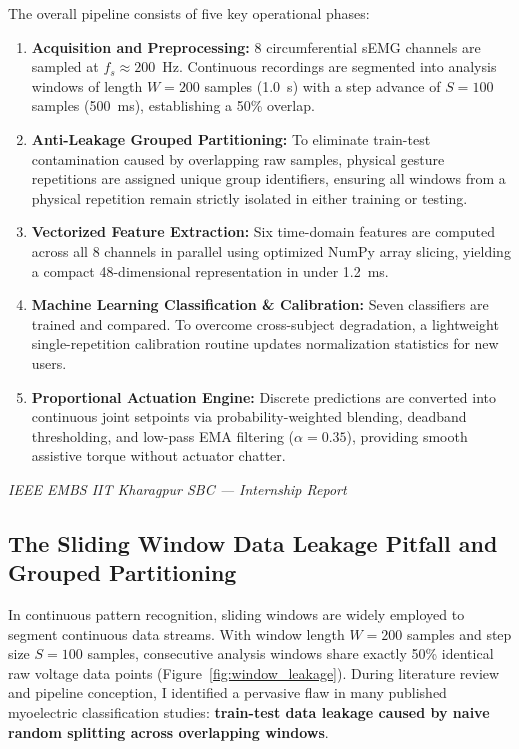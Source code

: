 \documentclass[12pt,a4paper]{article}
\begin{document}
The overall pipeline consists of five key operational phases:
\begin{enumerate}[leftmargin=*]
    \item \textbf{Acquisition and Preprocessing:} 8 circumferential sEMG channels are sampled at $f_s \approx 200$~Hz. Continuous recordings are segmented into analysis windows of length $W = 200$ samples (1.0~s) with a step advance of $S = 100$ samples (500~ms), establishing a 50\% overlap.
    \item \textbf{Anti-Leakage Grouped Partitioning:} To eliminate train-test contamination caused by overlapping raw samples, physical gesture repetitions are assigned unique group identifiers, ensuring all windows from a physical repetition remain strictly isolated in either training or testing.
    \item \textbf{Vectorized Feature Extraction:} Six time-domain features are computed across all 8 channels in parallel using optimized NumPy array slicing, yielding a compact 48-dimensional representation in under 1.2~ms.
    \item \textbf{Machine Learning Classification \& Calibration:} Seven classifiers are trained and compared. To overcome cross-subject degradation, a lightweight single-repetition calibration routine updates normalization statistics for new users.
    \item \textbf{Proportional Actuation Engine:} Discrete predictions are converted into continuous joint setpoints via probability-weighted blending, deadband thresholding, and low-pass EMA filtering ($\alpha = 0.35$), providing smooth assistive torque without actuator chatter.
\end{enumerate}

\vfill
\begin{center}
    \footnotesize\textit{IEEE EMBS IIT Kharagpur SBC --- Internship Report}
\end{center}

\newpage
\subsection{The Sliding Window Data Leakage Pitfall and Grouped Partitioning}

In continuous pattern recognition, sliding windows are widely employed to segment continuous data streams. With window length $W = 200$ samples and step size $S = 100$ samples, consecutive analysis windows share exactly 50\% identical raw voltage data points (Figure~\ref{fig:window_leakage}). During literature review and pipeline conception, I identified a pervasive flaw in many published myoelectric classification studies: \textbf{train-test data leakage caused by naive random splitting across overlapping windows}.
\end{document}
